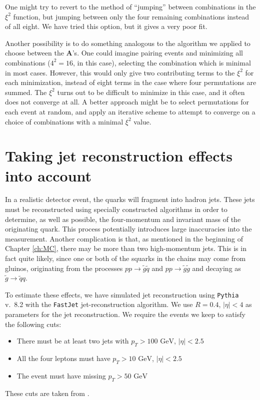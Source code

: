 \documentclass[twoside,english]{uiofysmaster}
\begin{document}
One might try to revert to the method of ``jumping'' between combinations in the $\xi^2$ function, but jumping between only the four remaining combinations instead of all eight. We have tried this option, but it gives a very poor fit.  

Another possibility is to do something analogous to the algorithm we applied to choose between the $\mathbf{A}$'s. One could imagine pairing events and minimizing all combinations ($4^2 = 16$, in this case), selecting the combination which is minimal in most cases. However, this would only give two contributing terms to the $\xi^2$ for each minimization, instead of eight terms in the case where four permutations are summed. The $\xi^2$ turns out to be difficult to minimize in this case, and it often does not converge at all. A better approach might be to select permutations for each event at random, and apply an iterative scheme to attempt to converge on a choice of combinations with a minimal $\xi^2$ value. 










\section{Taking jet reconstruction effects into account}
In a realistic detector event, the quarks will fragment into hadron jets. These jets must be reconstructed using specially constructed algorithms in order to determine, as well as possible, the four-momentum and invariant mass of the originating quark. This process potentially introduces large inaccuracies into the measurement. Another complication is that, as mentioned in the beginning of Chapter \ref{ch:MC}, there may be more than two high-momentum jets. This is in fact quite likely, since one or both of the squarks in the chains may come from gluinos, originating from the processes $pp \to \tilde g \tilde q$ and $pp \to \tilde g \tilde g$ and decaying as $\tilde g \to \tilde q q$. 

To estimate these effects, we have simulated jet reconstruction using {\tt Pythia} v.\ 8.2 \cite{Sjostrand:2014zea} with the {\tt FastJet} \cite{Cacciari:2011ma} jet-reconstruction algorithm. We use $R = 0.4$, $|\eta|<4$ as parameters for the jet reconstruction. We require the events we keep to satisfy the following cuts:
\begin{itemize}
	\item There must be at least two jets with $p_T > 100 \,\,\mathrm{GeV}$, $|\eta|<2.5$
	\item All the four leptons must have $p_T > 10 \,\,\mathrm{GeV}$, $|\eta|<2.5$
	\item The event must have missing $p_T > 50\,\,\mathrm{GeV}$
\end{itemize}
These cuts are taken from \cite{Cheng:2009fw}. 
\end{document}
